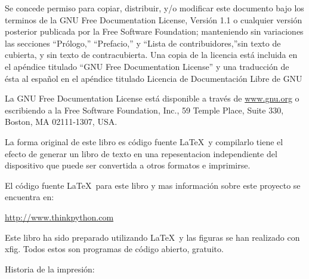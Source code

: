 \documentclass[a4paper, 11pt]{book}
\begin{document}
\vspace{0.25in}

\begin{flushleft}
\end{flushleft}

\vspace{0.25in}

Se concede permiso para copiar, distribuir, y/o modificar este documento bajo
los terminos de la GNU Free Documentation License, Versión 1.1 o cualquier
versión posterior publicada por la Free Software Foundation; manteniendo 
sin variaciones las secciones ``Prólogo,'' ``Prefacio,'' y ``Lista de 
contribuidores,''sin texto de cubierta, y sin texto de contracubierta. Una 
copia de la licencia está incluida en el apéndice titulado ``GNU Free 
Documentation License'' y una traducción de ésta al español en el apéndice 
titulado Licencia de Documentación Libre de GNU

La GNU Free Documentation License está disponible a través de \url{www.gnu.org}
o escribiendo a la Free Software Foundation, Inc., 59 Temple Place,
Suite 330, Boston, MA 02111-1307, USA.

La forma original de este libro es código fuente \LaTeX\  y compilarlo
tiene el efecto de generar un libro de texto en una repesentacion independiente 
del dispositivo que puede ser convertida a otros formatos e imprimirse.

El código  fuente \LaTeX\  para este libro y mas información sobre este proyecto
se encuentra en:

\begin{center}
      \url{http://www.thinkpython.com}
\end{center}

Este libro ha sido preparado utilizando \LaTeX\ y las figuras
se han realizado con xfig.  Todos estos son programas de código abierto, 
gratuito.

\vspace{0.25in}

Historia de la impresión:
\end{document}

